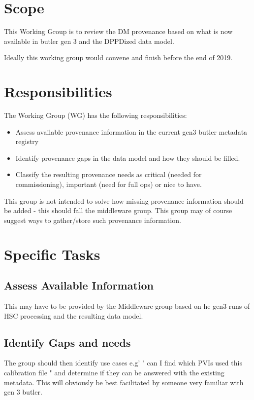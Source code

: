 
\section{Scope}

This Working Group is to review the \gls{DM} \gls{provenance} based on what is now
available in butler gen 3 and the DPPDized data model.

 Ideally this working group would convene and finish before the end of 2019.

\section{Responsibilities}

The Working Group (\gls{WG}) has the following responsibilities:

\begin{itemize}
    \item Assess available \gls{provenance} information in the current gen3 butler \gls{metadata} registry
    \item Identify \gls{provenance} gaps in the data model and how they should be filled.
    \item Classify the resulting \gls{provenance} needs as critical (needed for commissioning), important (need for full ops) or nice to have.
\end{itemize}

This group is not intended to solve how missing \gls{provenance} information should be added - this should fall the middleware group.
This group may of course suggest ways to gather/store such \gls{provenance} information.

\section{Specific Tasks}

\subsection{ Assess Available Information}

This may have to be provided by the Middleware group based on he gen3 runs of \gls{HSC} processing and the
resulting data model.

\subsection{Identify Gaps and needs}
The group should then identify use cases e.g' " can I find which PVIs used this \gls{calibration} file " and determine if they can be answered with the existing \gls{metadata}. This will obviously be best facilitated by someone very familiar with gen 3 butler.

